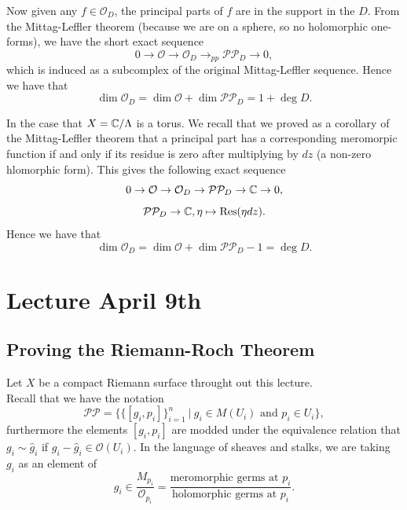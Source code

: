 \documentclass{article}
\begin{document}
{\begin{example}
    Now given any $f \in \mathcal{O}_D$, the principal parts of $f$ are in the support in the $D$. From the Mittag-Leffler theorem (because we are on a sphere, so no holomorphic one-forms), we have the short exact sequence  
    \[0 \to \mathcal{O} \to \mathcal{O}_D \to_{pp} \mathcal{P} \mathcal{P}_D \to 0,\]
    which is induced as a subcomplex of the original Mittag-Leffler sequence. Hence we have that
    \[\dim \mathcal{O}_D = \dim \mathcal{O} + \dim \mathcal{P} \mathcal{P}_D = 1 + \deg D.\]
\end{example}

\begin{example}
    In the case that $X = \mathbb{C} / \Lambda$ is a torus. We recall that we proved as a corollary of the Mittag-Leffler theorem that a principal part has a corresponding meromorpic function if and only if its residue is zero after multiplying by $dz$ (a non-zero hlomorphic form). This gives the following exact sequence
    \[0 \to \mathcal{O} \to \mathcal{O}_D \to \mathcal{P} \mathcal{P}_D \to \mathbb{C} \to 0,\]
    \[\mathcal{P} \mathcal{P}_D \to \mathbb{C}, \eta \mapsto \operatorname{Res}(\eta dz).\]
    Hence we have that
    \[\dim \mathcal{O}_D = \dim \mathcal{O} + \dim \mathcal{P} \mathcal{P}_D - 1  = \deg D.\]
\end{example}

\newpage
\section{Lecture April 9th}

\subsection{Proving the Riemann-Roch Theorem}
 Let $X$ be a compact Riemann surface throught out this lecture.  \\
 
Recall that we have the notation
\[\mathcal{P} \mathcal{P} = \{\{[g_i, p_i]\}_{i = 1}^n\ |\ g_i \in M(U_i) \text{ and } p_i \in U_i\},\]
furthermore the elements $[g_i, p_i]$ are modded under the equivalence relation that $g_i \sim \hat{g}_i$ if $g_i - \hat{g}_i \in \mathcal{O}(U_i)$. In the language of sheaves and stalks, we are taking $g_i$ as an element of 
\[g_i \in \frac{M_{p_i}}{\mathcal{O}_{p_i}} = \frac{\text{meromorphic germs at $p_i$}}{\text{holomorphic germs at $p_i$}}.\]

}
\end{document}
